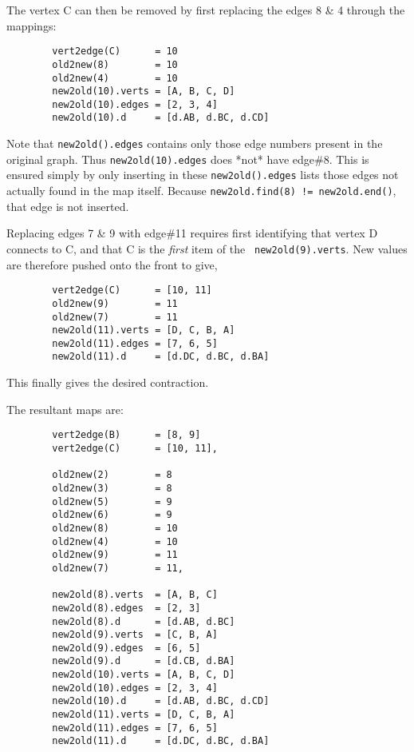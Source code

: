 \begin{spacing}{1.5}
    

    The vertex C can then be removed by first replacing the edges 8 \& 4 through the mappings:
    \begin{lstlisting}
        vert2edge(C)      = 10
        old2new(8)        = 10
        old2new(4)        = 10
        new2old(10).verts = [A, B, C, D]
        new2old(10).edges = [2, 3, 4]
        new2old(10).d     = [d.AB, d.BC, d.CD]
    \end{lstlisting}
    Note that {\tt new2old().edges} contains only those edge numbers present in the original graph. Thus {\tt new2old(10).edges} does *not* have
    edge\#8. This is ensured simply by only inserting in these {\tt new2old().edges} lists those edges not actually found in the map itself.
    Because {\tt new2old.find(8) != new2old.end()}, that edge is not inserted.

    Replacing edges 7 \& 9 with edge\#11 requires first identifying that vertex D connects to C, and that C is the {\it first} item of the {\tt
    new2old(9).verts}. New values are therefore pushed onto the front to give,
    \begin{lstlisting}
        vert2edge(C)      = [10, 11]
        old2new(9)        = 11
        old2new(7)        = 11
        new2old(11).verts = [D, C, B, A]
        new2old(11).edges = [7, 6, 5]
        new2old(11).d     = [d.DC, d.BC, d.BA]
    \end{lstlisting}

    \pagebreak
    This finally gives the desired contraction.

    

    The resultant maps are:
    \begin{lstlisting}
        vert2edge(B)      = [8, 9]
        vert2edge(C)      = [10, 11],

        old2new(2)        = 8
        old2new(3)        = 8
        old2new(5)        = 9
        old2new(6)        = 9
        old2new(8)        = 10
        old2new(4)        = 10
        old2new(9)        = 11
        old2new(7)        = 11,

        new2old(8).verts  = [A, B, C]
        new2old(8).edges  = [2, 3]
        new2old(8).d      = [d.AB, d.BC]
        new2old(9).verts  = [C, B, A]
        new2old(9).edges  = [6, 5]
        new2old(9).d      = [d.CB, d.BA]
        new2old(10).verts = [A, B, C, D]
        new2old(10).edges = [2, 3, 4]
        new2old(10).d     = [d.AB, d.BC, d.CD]
        new2old(11).verts = [D, C, B, A]
        new2old(11).edges = [7, 6, 5]
        new2old(11).d     = [d.DC, d.BC, d.BA]
    \end{lstlisting}


\end{spacing}
